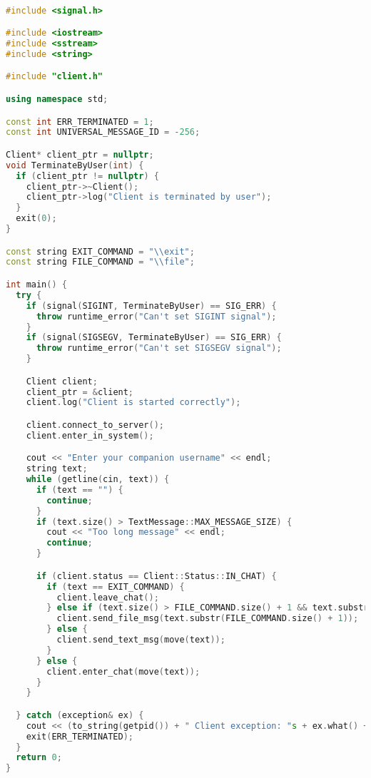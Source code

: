 \begin{lstlisting}[language=C++]

#include <signal.h>

#include <iostream>
#include <sstream>
#include <string>

#include "client.h"

using namespace std;

const int ERR_TERMINATED = 1;
const int UNIVERSAL_MESSAGE_ID = -256;

Client* client_ptr = nullptr;
void TerminateByUser(int) {
  if (client_ptr != nullptr) {
    client_ptr->~Client();
    client_ptr->log("Client is terminated by user");
  }
  exit(0);
}

const string EXIT_COMMAND = "\\exit";
const string FILE_COMMAND = "\\file";

int main() {
  try {
    if (signal(SIGINT, TerminateByUser) == SIG_ERR) {
      throw runtime_error("Can't set SIGINT signal");
    }
    if (signal(SIGSEGV, TerminateByUser) == SIG_ERR) {
      throw runtime_error("Can't set SIGSEGV signal");
    }

    Client client;
    client_ptr = &client;
    client.log("Client is started correctly");

    client.connect_to_server();
    client.enter_in_system();

    cout << "Enter your companion username" << endl;
    string text;
    while (getline(cin, text)) {
      if (text == "") {
        continue;
      }
      if (text.size() > TextMessage::MAX_MESSAGE_SIZE) {
        cout << "Too long message" << endl;
        continue;
      }

      if (client.status == Client::Status::IN_CHAT) {
        if (text == EXIT_COMMAND) {
          client.leave_chat();
        } else if (text.size() > FILE_COMMAND.size() + 1 && text.substr(0, FILE_COMMAND.size()) == FILE_COMMAND && text[FILE_COMMAND.size()] == ' ') {
          client.send_file_msg(text.substr(FILE_COMMAND.size() + 1));
        } else {
          client.send_text_msg(move(text));
        }
      } else {
        client.enter_chat(move(text));
      }
    }

  } catch (exception& ex) {
    cout << (to_string(getpid()) + " Client exception: "s + ex.what() + "\nClient terminated by exception"s) << endl;
    exit(ERR_TERMINATED);
  }
  return 0;
}

\end{lstlisting}

